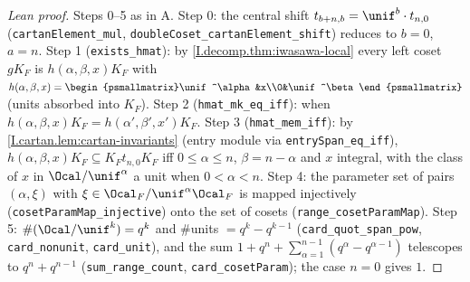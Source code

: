 \begin{proof}[Lean proof]
Steps 0--5 as in A. Step 0: the central shift $t_{b+n,b}=\unif^b\cdot t_{n,0}$ (\texttt{cartanElement\_mul}, \texttt{doubleCoset\_cartanElement\_shift}) reduces to $b=0$, $a=n$. Step 1 (\texttt{exists\_hmat}): by \cref{I.decomp.thm:iwasawa-local} every left coset $gK_F$ is $h(\alpha,\beta,x)K_F$ with $h(\alpha,\beta,x)=\begin{psmallmatrix}\unif^\alpha&x\\0&\unif^\beta\end{psmallmatrix}$ (units absorbed into $K_F$). Step 2 (\texttt{hmat\_mk\_eq\_iff}): when $h(\alpha,\beta,x)K_F=h(\alpha',\beta',x')K_F$. Step 3 (\texttt{hmat\_mem\_iff}): by \cref{I.cartan.lem:cartan-invariants} (entry module via \texttt{entrySpan\_eq\_iff}), $h(\alpha,\beta,x)K_F\subseteq K_Ft_{n,0}K_F$ iff $0\le\alpha\le n$, $\beta=n-\alpha$ and $x$ integral, with the class of $x$ in $\Ocal/\unif^\alpha$ a unit when $0<\alpha<n$. Step 4: the parameter set of pairs $(\alpha,\xi)$ with $\xi\in\Ocal_F/\unif^\alpha\Ocal_F$ is mapped injectively (\texttt{cosetParamMap\_injective}) onto the set of cosets (\texttt{range\_cosetParamMap}). Step 5: $\#(\Ocal/\unif^k)=q^k$ and $\#$units $=q^k-q^{k-1}$ (\texttt{card\_quot\_span\_pow}, \texttt{card\_nonunit}, \texttt{card\_unit}), and the sum $1+q^n+\sum_{\alpha=1}^{n-1}(q^\alpha-q^{\alpha-1})$ telescopes to $q^n+q^{n-1}$ (\texttt{sum\_range\_count}, \texttt{card\_cosetParam}); the case $n=0$ gives $1$.
\end{proof}

\begin{tfoutline}
\end{tfoutline}

